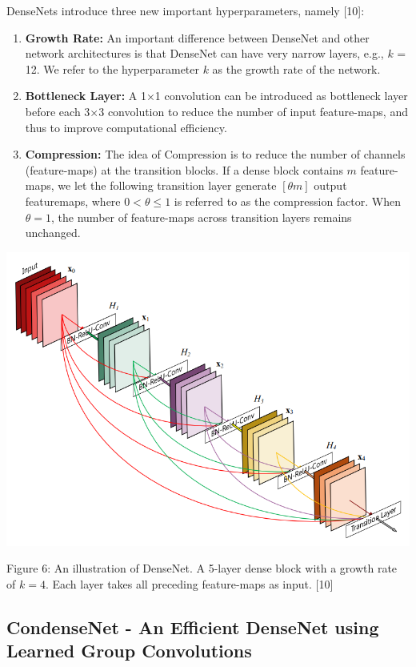 \documentclass[conference]{IEEEtran}
\begin{document}
DenseNets introduce three new important hyperparameters, namely [10]:
\begin{enumerate}
    \item \textbf{Growth Rate:} An important difference between DenseNet and other network architectures is that DenseNet can have very narrow layers, e.g., $k$ = 12. We refer to the hyperparameter $k$ as the growth rate of the network.
    \item \textbf{Bottleneck Layer:} A 1×1 convolution can be introduced as bottleneck layer before each 3×3 convolution to reduce the number of input feature-maps, and thus to improve computational efficiency.
    \item \textbf{Compression:} The idea of Compression is to reduce the number of channels (feature-maps) at the transition blocks. If a dense block contains $m$ feature-maps, we let the following transition layer generate $[\theta m]$ output featuremaps, where $0 <\theta \leq1$ is referred to as the compression factor. When $\theta = 1$, the number of feature-maps across transition layers remains unchanged.
\end{enumerate}

\begin{center}
    \includegraphics[scale=0.32]{DenseNEt.PNG}\\
\end{center}
Figure 6: An illustration of DenseNet. A 5-layer dense block with a growth rate of $k = 4$. Each layer takes all preceding feature-maps as input. [10]

\subsection{\textbf{CondenseNet - An Efficient DenseNet using Learned Group Convolutions}}
\end{document}

